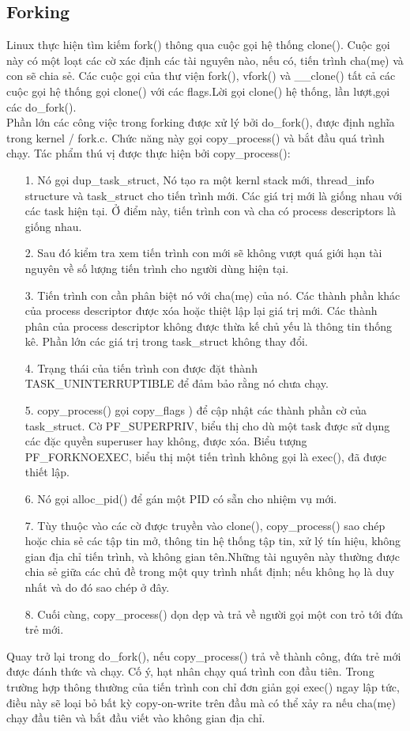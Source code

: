\documentclass[a4paper,10pt]{report}
\begin{document}
\subsection{Forking}
Linux thực hiện tìm kiếm fork() thông qua cuộc gọi hệ thống clone(). Cuộc gọi này có một loạt các cờ xác định các tài nguyên nào, nếu có, tiến trình cha(mẹ) và con sẽ chia sẻ. Các cuộc gọi của thư viện fork(), vfork() và \_\_clone() tất cả các cuộc gọi hệ thống gọi clone() với các flags.Lời gọi clone() hệ thống, lần lượt,gọi các do\_fork().\\

Phần lớn các công việc trong forking được xử lý bởi do\_fork(), được định nghĩa trong kernel / fork.c. Chức năng này gọi copy\_process() và bắt đầu quá trình chạy. Tác phẩm thú vị được thực hiện bởi copy\_process():
\begin{itemize}
\item[1. ] Nó gọi dup\_task\_struct, Nó tạo ra một kernl stack mới, thread\_info structure và task\_struct cho tiến trình mới. Các giá trị mới là giống nhau với các task hiện tại. Ở điểm này, tiến trình con và cha có process descriptors là giống nhau.
\item[2. ] Sau đó kiểm tra xem tiến trình con mới sẽ không vượt quá giới hạn tài nguyên về số lượng tiến trình cho người dùng hiện tại.
\item[3. ] Tiến trình con cần phân biệt nó với cha(mẹ) của nó. Các thành phần khác của process descriptor được xóa hoặc thiệt lập lại giá trị mới. Các thành phân của process descriptor không được thừa kế chủ yếu là thông tin thống kê. Phần lớn các giá trị trong task\_struct không thay đổi.
\item[4. ] Trạng thái của tiến trình con được đặt thành TASK\_UNINTERRUPTIBLE để đảm bảo rằng nó chưa chạy.
\item[5. ] copy\_process() gọi copy\_flags ) để cập nhật các thành phần cờ của task\_struct. Cờ PF\_SUPERPRIV, biểu thị cho dù một task được sử dụng các đặc quyền superuser hay không, được xóa. Biểu tượng \\ PF\_FORKNOEXEC, biểu thị một tiến trình không gọi là exec(), đã được thiết lập.
\item[6. ] Nó gọi alloc\_pid() để gán một PID có sẵn cho nhiệm vụ mới.
\item[7. ] Tùy thuộc vào các cờ được truyền vào clone(), copy\_process() sao chép hoặc chia sẻ các tập tin mở, thông tin hệ thống tập tin, xử lý tín hiệu, không gian địa chỉ tiến trình, và không gian tên.Những tài nguyên này thường được chia sẻ giữa các chủ đề trong một quy trình nhất định; nếu không họ là duy nhất và do đó sao chép ở đây.
\item[8. ] Cuối cùng, copy\_process() dọn dẹp và trả về người gọi một con trỏ tới đứa trẻ mới.
\end{itemize}
Quay trở lại trong do\_fork(), nếu copy\_process() trả về thành công, đứa trẻ mới được đánh thức và chạy. Cố ý, hạt nhân chạy quá trình con đầu tiên. Trong trường hợp thông thường của tiến trình con chỉ đơn giản gọi exec() ngay lập tức, điều này sẽ loại bỏ bất kỳ copy-on-write trên đầu mà có thể xảy ra nếu cha(mẹ) chạy đầu tiên và bắt đầu viết vào không gian địa chỉ.
\end{document}
